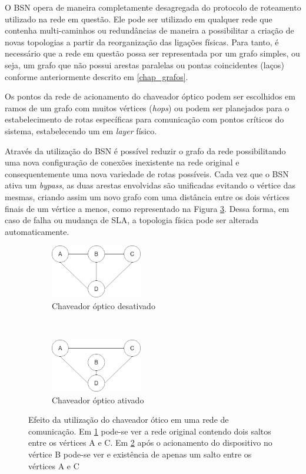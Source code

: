 O BSN opera de maneira completamente desagregada do protocolo de roteamento utilizado na rede em questão. Ele pode ser utilizado em qualquer rede que contenha multi-caminhos ou redundâncias de maneira a possibilitar a criação de novas topologias a partir da reorganização das ligações físicas. Para tanto, é necessário que a rede em questão possa ser representada por um grafo simples, ou seja, um grafo que não possui arestas paralelas ou pontas coincidentes (laços) conforme anteriormente descrito em \ref{chap_grafos}.

Os pontos da rede de acionamento do chaveador óptico podem ser escolhidos em ramos de um grafo com muitos vértices (\emph{hops}) ou podem ser planejados para o estabelecimento de rotas específicas para comunicação com pontos críticos do sistema, estabelecendo um  em \emph{layer} físico.

Através da utilização do BSN é possível reduzir o grafo da rede possibilitando uma nova configuração de conexões inexistente na rede original e consequentemente uma nova variedade de rotas possíveis. Cada vez que o BSN ativa um \emph{bypass}, as duas arestas envolvidas são unificadas evitando o vértice das mesmas, criando assim um novo grafo com uma distância entre os dois vértices finais de um vértice a menos, como representado na Figura \ref{fig-bypass-exemplo}. Dessa forma, em caso de falha ou mudança de SLA, a topologia física pode ser alterada automaticamente.

\begin{figure}[t!]
	\centering
	\begin{subfigure}[t]{0.4\textwidth}
		\centering
		\includegraphics[width=4cm]{./figuras/Bypass-exemplo-A.png} %
		\caption{Chaveador óptico desativado}
		\label{fig_bypass_exemplo_A}
	\end{subfigure}%
	~
	\begin{subfigure}[t]{0.4\textwidth}
		\centering
		\includegraphics[width=4cm]{./figuras/Bypass-exemplo-B.png} %
	\caption{Chaveador óptico ativado}
	\label{fig_bypass_exemplo_B}
	\end{subfigure}
	\caption[Exemplo de atuação de \emph{by-pass} óptico]{Efeito da utilização do chaveador ótico em uma rede de comunicação. Em \ref{fig_bypass_exemplo_A} pode-se ver a rede original contendo dois saltos entre os vértices A e C. Em \ref{fig_bypass_exemplo_B} após o acionamento do dispositivo no vértice B pode-se ver e existência de apenas um salto entre os vértices A e C}
	\label{fig-bypass-exemplo}
\end{figure}

